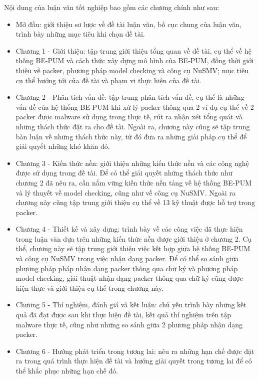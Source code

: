 \hspace{0.5cm}Nội dung của luận văn tốt nghiệp bao gồm các chương chính như sau:

\begin{itemize}
\item{Mở đầu: giới thiệu sơ lược về đề tài luận văn, bố cục chung của luận văn, trình bày những mục tiêu khi chọn đề tài.\\}
\item{Chương 1 - Giới thiệu: tập trung giới thiệu tổng quan về đề tài, cụ thể về hệ thống BE-PUM và cách thức xây dựng mô hình của BE-PUM, đồng thời giới thiệu về packer, phương pháp model checking và công cụ NuSMV; mục tiêu cụ thể hướng tới của đề tài và phạm vi thực hiện của đề tài.\\}
\item{Chương 2 - Phân tích vấn đề: tập trung phân tích vấn đề, cụ thể là những vấn đề của hệ thống BE-PUM khi xử lý packer thông qua 2 ví dụ cụ thể về 2 packer được malware sử dụng trong thực tế, rút ra nhận xét tổng quát và những thách thức đặt ra cho đề tài. Ngoài ra, chương này cũng sẽ tập trung bàn luận về những thách thức này, từ đó đưa ra những giải pháp cụ thể để giải quyết những khó khăn đó.\\}
\item{Chương 3 - Kiến thức nền: giới thiệu những kiến thức nền và các công nghệ được sử dụng trong đề tài. Để có thể giải quyết những thách thức như chương 2 đã nêu ra, cần nắm vững kiến thức nền tảng về hệ thống BE-PUM và lý thuyết về model checking, cũng như về công cụ NuSMV. Ngoài ra chương này cũng tập trung giới thiệu cụ thể về 13 kỹ thuật được hỗ trợ trong packer.\\}
\item{Chương 4 - Thiết kế và xây dựng: trình bày về các công việc đã thực hiện trong luận văn dựa trên những kiến thức nền được giới thiệu ở chương 2. Cụ thể, chương này sẽ tập trung giới thiệu việc kết hợp giữa hệ thống BE-PUM và công cụ NuSMV trong việc nhận dạng packer. Để có thể so sánh giữa phương pháp pháp nhận dạng packer thông qua chữ ký và phương pháp model checking, giải thuật nhận dạng packer thông qua chữ ký cũng được hiện thực và giới thiệu cụ thể trong chương này.\\}
\item{Chương 5 - Thí nghiệm, đánh giá và kết luận: chủ yếu trình bày những kết quả đã đạt được sau khi thực hiện đề tài, kết quả thí nghiệm trên tập malware thực tế, cũng như những so sánh giữa 2 phương pháp nhận dạng packer.\\}
\item{Chương 6 - Hướng phát triển trong tương lai: nêu ra những hạn chế được đặt ra trong quá trình thực hiện đề tài và hướng giải quyết trong tương lai để có thể khắc phục những hạn chế đó.}
\end{itemize}
